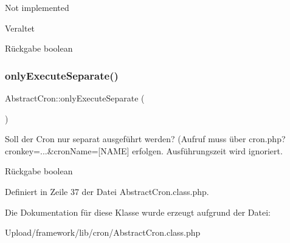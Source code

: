 Not implemented \begin{DoxyRefDesc}{Veraltet}
\item[\mbox{\hyperlink{deprecated__deprecated000008}{Veraltet}}]\end{DoxyRefDesc}
\begin{DoxyReturn}{Rückgabe}
boolean 
\end{DoxyReturn}
\mbox{\label{class_abstract_cron_a002e8742222233f71416c6d180bc42e9}} 
\subsubsection{\texorpdfstring{only\+Execute\+Separate()}{onlyExecuteSeparate()}}
{\footnotesize\ttfamily Abstract\+Cron\+::only\+Execute\+Separate (\begin{DoxyParamCaption}{ }\end{DoxyParamCaption})}

Soll der Cron nur separat ausgeführt werden? (Aufruf muss über cron.\+php?cronkey=...\&cron\+Name=\mbox{[}N\+A\+ME\mbox{]} erfolgen. Ausführungszeit wird ignoriert. \begin{DoxyReturn}{Rückgabe}
boolean 
\end{DoxyReturn}


Definiert in Zeile 37 der Datei Abstract\+Cron.\+class.\+php.



Die Dokumentation für diese Klasse wurde erzeugt aufgrund der Datei\+:\begin{DoxyCompactItemize}
\item 
Upload/framework/lib/cron/Abstract\+Cron.\+class.\+php\end{DoxyCompactItemize}
